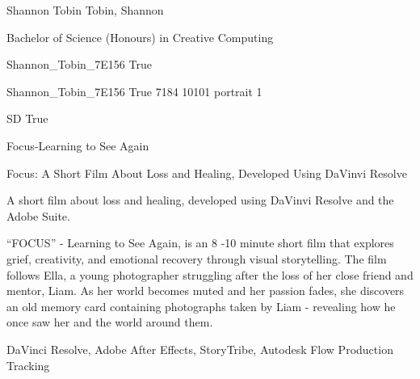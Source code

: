 \documentclass[twoside]{report}
\begin{document}
\begingroup{}\relax



\def\Key{Shannon_Tobin_7E156}

{Shannon Tobin}
{Tobin, Shannon}

{Bachelor of Science (Honours) in Creative Computing}

{Shannon_Tobin_7E156}
{True}

{Shannon_Tobin_7E156}
{True}
{7184}
{10101}
{portrait}
{1}

{SD}
{True}

{Focus-Learning to See Again}

{Focus: A Short Film About Loss and Healing, Developed Using DaVinvi Resolve}

{A short film about loss and healing, developed using DaVinvi Resolve and the Adobe Suite.

“FOCUS” - Learning to See Again, is an 8 -10 minute short film that explores grief, creativity, and emotional recovery through visual storytelling. The film follows Ella, a young photographer struggling after the loss of her close friend and mentor, Liam. As her world becomes muted and her passion fades, she discovers an old memory card containing photographs taken by Liam - revealing how he once saw her and the world around them.}

{DaVinci Resolve, Adobe After Effects, StoryTribe, Autodesk Flow Production Tracking}
\end{document}
